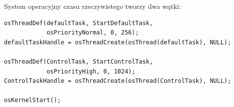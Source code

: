 System operacyjny czasu rzeczywistego tworzy dwa wątki:

\begin{lstlisting}[style=cstyle, caption={Tworzenie zadań FreeRTOS (main.c)}]
osThreadDef(defaultTask, StartDefaultTask,
            osPriorityNormal, 0, 256);
defaultTaskHandle = osThreadCreate(osThread(defaultTask), NULL);

osThreadDef(ControlTask, StartControlTask,
            osPriorityHigh, 0, 1024);
ControlTaskHandle = osThreadCreate(osThread(ControlTask), NULL);

osKernelStart();
\end{lstlisting}

